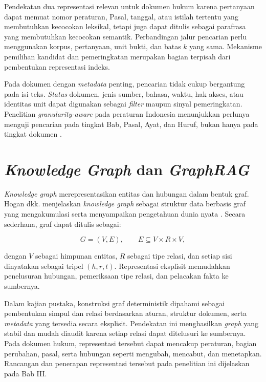 Pendekatan dua representasi relevan untuk dokumen hukum karena pertanyaan dapat memuat nomor peraturan, Pasal, tanggal, atau istilah tertentu yang membutuhkan kecocokan leksikal, tetapi juga dapat ditulis sebagai parafrasa yang membutuhkan kecocokan semantik. Perbandingan jalur pencarian perlu menggunakan korpus, pertanyaan, unit bukti, dan batas $k$ yang sama. Mekanisme pemilihan kandidat dan pemeringkatan merupakan bagian terpisah dari pembentukan representasi indeks.

Pada dokumen dengan \emph{metadata} penting, pencarian tidak cukup bergantung pada isi teks. \emph{Status} dokumen, jenis sumber, bahasa, waktu, hak akses, atau identitas unit dapat digunakan sebagai \emph{filter} maupun sinyal pemeringkatan. Penelitian \emph{granularity-aware} pada peraturan Indonesia menunjukkan perlunya menguji pencarian pada tingkat Bab, Pasal, Ayat, dan Huruf, bukan hanya pada tingkat dokumen \parencite{faisalGranularityAwareLegal2024}.

\section{\emph{Knowledge Graph} dan \emph{GraphRAG}}

\emph{Knowledge graph} merepresentasikan entitas dan hubungan dalam bentuk graf. Hogan dkk. menjelaskan \emph{knowledge graph} sebagai struktur data berbasis graf yang mengakumulasi serta menyampaikan pengetahuan dunia nyata \parencite{hoganKnowledgeGraphs2022}. Secara sederhana, graf dapat ditulis sebagai:

\begin{equation}
    G=(V,E), \qquad E\subseteq V\times R\times V,
\end{equation}

dengan $V$ sebagai himpunan entitas, $R$ sebagai tipe relasi, dan setiap sisi dinyatakan sebagai tripel $(h,r,t)$. Representasi eksplisit memudahkan penelusuran hubungan, pemeriksaan tipe relasi, dan pelacakan fakta ke sumbernya.

Dalam kajian pustaka, konstruksi graf deterministik dipahami sebagai pembentukan simpul dan relasi
berdasarkan aturan, struktur dokumen, serta \emph{metadata} yang tersedia secara eksplisit. Pendekatan
ini menghasilkan \emph{graph} yang stabil dan mudah diaudit karena setiap relasi dapat ditelusuri ke
sumbernya. Pada dokumen hukum, representasi tersebut dapat mencakup peraturan, bagian perubahan,
pasal, serta hubungan seperti mengubah, mencabut, dan menetapkan. Rancangan dan penerapan representasi
tersebut pada penelitian ini dijelaskan pada Bab III.

